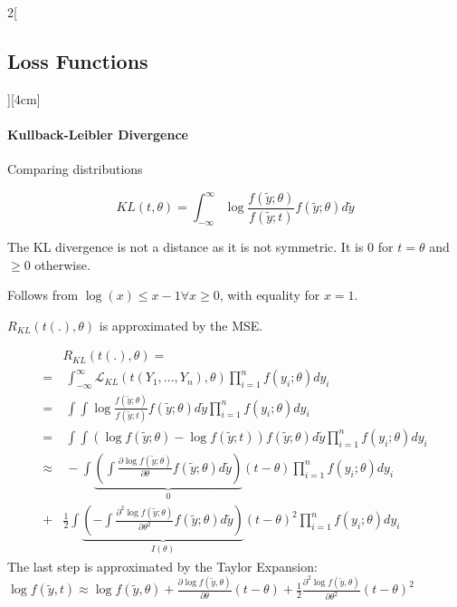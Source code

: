 \documentclass[8pt]{extarticle}
\begin{document}
\begin{multicols}{2}[\subsection{Loss Functions}][4cm]
\paragraph{Kullback-Leibler Divergence} Comparing distributions

$$KL(t,\theta) = \int_{-\infty}^\infty \log\frac{f(\tilde{y};\theta)}{f(\tilde{y};t)} f(\tilde{y};\theta) d\tilde{y}$$

\noindent The KL divergence is not a distance as it is not symmetric.
\noindent It is $0$ for $t=\theta$ and $\geq 0$ otherwise.
\begin{Proof}
Follows from $\log (x) \leq x-1 \forall x \geq 0$, with equality for $x=1$.
\end{Proof}

\noindent $R_{KL} (t(.), \theta)$ is approximated by the MSE.
\begin{Proof}
\vspace{-1.5em}
\begin{align*}
& R_{KL} (t(.), \theta) = \\ =&\: \int_{-\infty}^\infty \mathcal{L}_{KL}(t(Y_1,...,Y_n),\theta) \prod_{i=1}^n f(y_i;\theta)dy_i \\
=&\: \int\int \log\frac{f(\tilde{y};\theta)}{f(\tilde{y};t)} f(\tilde{y};\theta) d\tilde{y} \prod_{i=1}^n f(y_i;\theta)dy_i \\
=&\: \int\int \left(\log f(\tilde{y};\theta) - \log f(\tilde{y};t) \right) f(\tilde{y};\theta) d\tilde{y}  \prod_{i=1}^n f(y_i;\theta)dy_i \\
\approx & \: - \int \underbrace{\left( \int \frac{\partial \log f(\tilde{y};\theta)}{\partial \theta} f(\tilde{y};\theta)d\tilde{y}\right)}_{0}\left(t-\theta\right) \prod_{i=1}^n f(y_i;\theta)dy_i  \\
+ &  \frac{1}{2} \int \underbrace{\left( - \int \frac{\partial^2 \log f(\tilde{y};\theta)}{\partial \theta^2} f(\tilde{y};\theta)d\tilde{y}\right)}_{I(\theta)}\left(t-\theta\right)^2 \prod_{i=1}^n f(y_i;\theta)dy_i 
\end{align*}
The last step is approximated by the Taylor Expansion:
$\log f(\tilde{y}, t) \approx \log f(\tilde{y},\theta) {+} \frac{\partial\log f(\tilde{y}, \theta)}{\partial\theta} (t{-}\theta) {+} \frac{1}{2} \frac{\partial^2\log f(\tilde{y}, \theta)}{\partial\theta^2} (t{-}\theta)^2$
\end{Proof}
\end{multicols}
\end{document}
